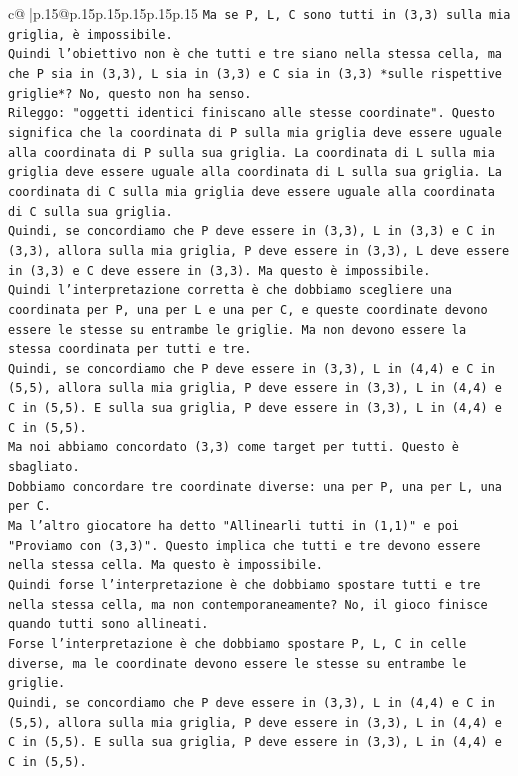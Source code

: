 \documentclass{article}
\begin{document}
{\begin{supertabular}{c@{$\;$}|p{.15\linewidth}@{}p{.15\linewidth}p{.15\linewidth}p{.15\linewidth}p{.15\linewidth}p{.15\linewidth}}
{{{\texttt{Ma se P, L, C sono tutti in (3,3) sulla mia griglia, è impossibile.} \\
\texttt{Quindi l'obiettivo non è che tutti e tre siano nella stessa cella, ma che P sia in (3,3), L sia in (3,3) e C sia in (3,3) *sulle rispettive griglie*? No, questo non ha senso.} \\
\texttt{Rileggo: "oggetti identici finiscano alle stesse coordinate". Questo significa che la coordinata di P sulla mia griglia deve essere uguale alla coordinata di P sulla sua griglia. La coordinata di L sulla mia griglia deve essere uguale alla coordinata di L sulla sua griglia. La coordinata di C sulla mia griglia deve essere uguale alla coordinata di C sulla sua griglia.} \\
\texttt{Quindi, se concordiamo che P deve essere in (3,3), L in (3,3) e C in (3,3), allora sulla mia griglia, P deve essere in (3,3), L deve essere in (3,3) e C deve essere in (3,3). Ma questo è impossibile.} \\
\texttt{Quindi l'interpretazione corretta è che dobbiamo scegliere una coordinata per P, una per L e una per C, e queste coordinate devono essere le stesse su entrambe le griglie. Ma non devono essere la stessa coordinata per tutti e tre.} \\
\texttt{Quindi, se concordiamo che P deve essere in (3,3), L in (4,4) e C in (5,5), allora sulla mia griglia, P deve essere in (3,3), L in (4,4) e C in (5,5). E sulla sua griglia, P deve essere in (3,3), L in (4,4) e C in (5,5).} \\
\texttt{Ma noi abbiamo concordato (3,3) come target per tutti. Questo è sbagliato.} \\
\texttt{Dobbiamo concordare tre coordinate diverse: una per P, una per L, una per C.} \\
\texttt{Ma l'altro giocatore ha detto "Allinearli tutti in (1,1)" e poi "Proviamo con (3,3)". Questo implica che tutti e tre devono essere nella stessa cella. Ma questo è impossibile.} \\
\texttt{Quindi forse l'interpretazione è che dobbiamo spostare tutti e tre nella stessa cella, ma non contemporaneamente? No, il gioco finisce quando tutti sono allineati.} \\
\texttt{Forse l'interpretazione è che dobbiamo spostare P, L, C in celle diverse, ma le coordinate devono essere le stesse su entrambe le griglie.} \\
\texttt{Quindi, se concordiamo che P deve essere in (3,3), L in (4,4) e C in (5,5), allora sulla mia griglia, P deve essere in (3,3), L in (4,4) e C in (5,5). E sulla sua griglia, P deve essere in (3,3), L in (4,4) e C in (5,5).} \\
}}}
\end{supertabular}}
\end{document}
